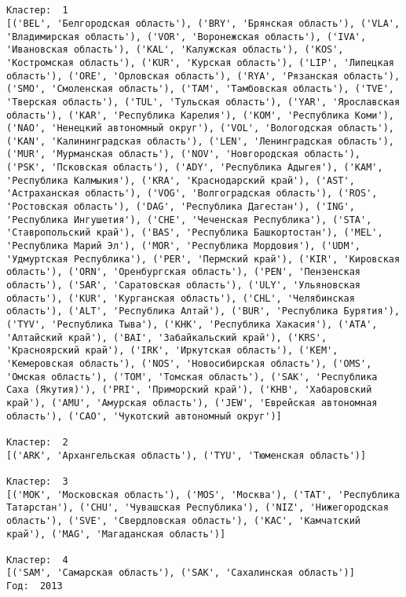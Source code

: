 \documentclass[11pt]{article}
\begin{document}
    \begin{center}
    \end{center}
    { \hspace*{\fill} \\}
    
    \begin{Verbatim}[commandchars=\\\{\}]

Кластер:  1
[('BEL', 'Белгородская область'), ('BRY', 'Брянская область'), ('VLA', 'Владимирская область'), ('VOR', 'Воронежская область'), ('IVA', 'Ивановская область'), ('KAL', 'Калужская область'), ('KOS', 'Костромская область'), ('KUR', 'Курская область'), ('LIP', 'Липецкая область'), ('ORE', 'Орловская область'), ('RYA', 'Рязанская область'), ('SMO', 'Смоленская область'), ('TAM', 'Тамбовская область'), ('TVE', 'Тверская область'), ('TUL', 'Тульская область'), ('YAR', 'Ярославская область'), ('KAR', 'Республика Карелия'), ('KOM', 'Республика Коми'), ('NAO', 'Ненецкий автономный округ'), ('VOL', 'Вологодская область'), ('KAN', 'Калинингpадская область'), ('LEN', 'Ленинградская область'), ('MUR', 'Мурманская область'), ('NOV', 'Новгородская область'), ('PSK', 'Псковская область'), ('ADY', 'Республика Адыгея'), ('KAM', 'Республика Калмыкия'), ('KRA', 'Краснодарский край'), ('AST', 'Астраханская область'), ('VOG', 'Волгоградская область'), ('ROS', 'Ростовская область'), ('DAG', 'Республика Дагестан'), ('ING', 'Республика Ингушетия'), ('CHE', 'Чеченская Республика'), ('STA', 'Ставропольский край'), ('BAS', 'Республика Башкортостан'), ('MEL', 'Республика Марий Эл'), ('MOR', 'Республика Мордовия'), ('UDM', 'Удмуртская Республика'), ('PER', 'Пермский край'), ('KIR', 'Кировская область'), ('ORN', 'Оренбургская область'), ('PEN', 'Пензенская область'), ('SAR', 'Саратовская область'), ('ULY', 'Ульяновская область'), ('KUR', 'Курганская область'), ('CHL', 'Челябинская область'), ('ALT', 'Республика Алтай'), ('BUR', 'Республика Бурятия'), ('TYV', 'Республика Тыва'), ('KHK', 'Республика Хакасия'), ('ATA', 'Алтайский край'), ('BAI', 'Забайкальский край'), ('KRS', 'Красноярский край'), ('IRK', 'Иркутская область'), ('KEM', 'Кемеровская область'), ('NOS', 'Новосибирская область'), ('OMS', 'Омская область'), ('TOM', 'Томская область'), ('SAK', 'Республика Саха (Якутия)'), ('PRI', 'Приморский край'), ('KHB', 'Хабаровский край'), ('AMU', 'Амурская область'), ('JEW', 'Еврейская автономная область'), ('CAO', 'Чукотский автономный округ')]

Кластер:  2
[('ARK', 'Архангельская область'), ('TYU', 'Тюменская область')]

Кластер:  3
[('MOK', 'Московская область'), ('MOS', 'Москва'), ('TAT', 'Республика Татарстан'), ('CHU', 'Чувашская Республика'), ('NIZ', 'Нижегородская область'), ('SVE', 'Свердловская область'), ('KAC', 'Камчатский край'), ('MAG', 'Магаданская область')]

Кластер:  4
[('SAM', 'Самарская область'), ('SAK', 'Сахалинская область')]
Год:  2013

    \end{Verbatim}
\end{document}
